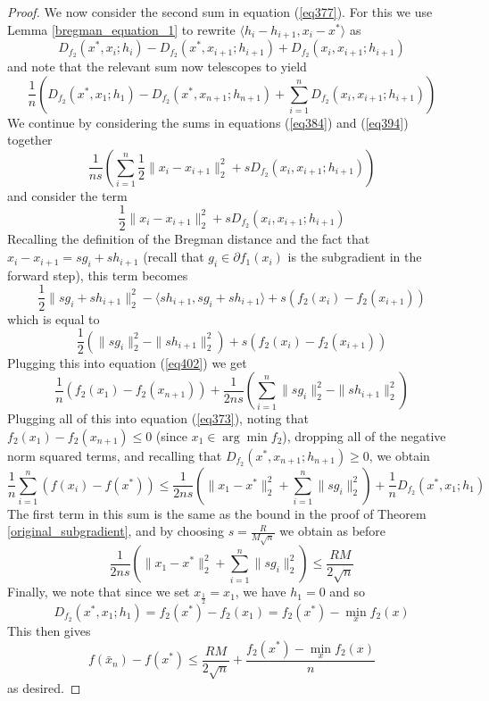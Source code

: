 \begin{proof}
 We now consider the second sum in equation (\ref{eq377}). For this we use Lemma \ref{bregman_equation_1} to rewrite
 $\langle h_i - h_{i+1}, x_i - x^*\rangle$ as
 \begin{equation}
  D_{f_2}(x^*,x_i;h_i) - D_{f_2}(x^*,x_{i+1};h_{i+1}) + D_{f_2}(x_i,x_{i+1};h_{i+1})
 \end{equation}
 and note that the relevant sum now telescopes to yield
 \begin{equation}\label{eq394}
  \frac{1}{n}\left(D_{f_2}(x^*,x_1;h_1) - D_{f_2}(x^*,x_{n+1};h_{n+1}) + 
  \displaystyle\sum_{i = 1}^n D_{f_2}(x_i,x_{i+1};h_{i+1})\right)
 \end{equation}
 We continue by considering the sums in equations (\ref{eq384}) and (\ref{eq394}) together
 \begin{equation}\label{eq402}
  \frac{1}{ns}\left(\displaystyle\sum_{i = 1}^n \frac{1}{2}\|x_i - x_{i+1}\|_2^2 + sD_{f_2}(x_i,x_{i+1};h_{i+1})\right)
 \end{equation}
 and consider the term
 $$\frac{1}{2}\|x_i - x_{i+1}\|_2^2 + sD_{f_2}(x_i,x_{i+1};h_{i+1})
 $$
 Recalling the definition of the Bregman distance and the fact that $x_i - x_{i+1} = sg_i + sh_{i+1}$ (recall that
 $g_i\in\partial f_1(x_i)$ is the subgradient in the forward step), this term becomes
 $$\frac{1}{2}\|sg_i + sh_{i+1}\|_2^2 - \langle sh_{i+1}, sg_i + sh_{i+1}\rangle + s(f_2(x_i) - f_2(x_{i+1})) 
 $$
 which is equal to
 \begin{equation}
  \frac{1}{2}(\|sg_i\|_2^2 - \|sh_{i + 1}\|_2^2) + s(f_2(x_i) - f_2(x_{i+1})) 
 \end{equation}
 Plugging this into equation (\ref{eq402}) we get
 \begin{equation}
  \frac{1}{n}(f_2(x_1) - f_2(x_{n+1})) + \frac{1}{2ns}\left(\displaystyle\sum_{i = 1}^n\|sg_i\|_2^2 - \|sh_{i + 1}\|_2^2\right)
 \end{equation}
 Plugging all of this into equation (\ref{eq373}), noting that $f_2(x_1) - f_2(x_{n+1}) \leq 0$ (since $x_1\in \arg\min f_2$),
 dropping all of the negative norm squared terms, and recalling that $D_{f_2}(x^*,x_{n+1};h_{n+1}) \geq 0$, we obtain
 \begin{equation}
  \frac{1}{n}\displaystyle\sum_{i = 1}^n (f(x_i) - f(x^*)) \leq \frac{1}{2ns}\left(\|x_1 - x^*\|_2^2 + \displaystyle\sum_{i = 1}^n\|sg_i\|_2^2\right)
  + \frac{1}{n}D_{f_2}(x^*,x_1;h_1)
 \end{equation}
 The first term in this sum is the same as the bound in the proof of Theorem \ref{original_subgradient}, and by choosing $s = \frac{R}{M\sqrt{n}}$
 we obtain as before
 \begin{equation}
  \frac{1}{2ns}\left(\|x_1 - x^*\|_2^2 + \displaystyle\sum_{i = 1}^n\|sg_i\|_2^2\right) \leq \frac{RM}{2\sqrt{n}}
 \end{equation}
 Finally, we note that since we set $x_{\frac{1}{2}} = x_1$, we have $h_1 = 0$ and so
 $$D_{f_2}(x^*,x_1;h_1) = f_2(x^*) - f_2(x_1) = f_2(x^*) - \min_x f_2(x)
 $$
 This then gives
 \begin{equation}
  f(\bar{x}_n) - f(x^*) \leq \frac{RM}{2\sqrt{n}} + \frac{f_2(x^*) - \min_x f_2(x)}{n}
 \end{equation}
 as desired.


\end{proof}
